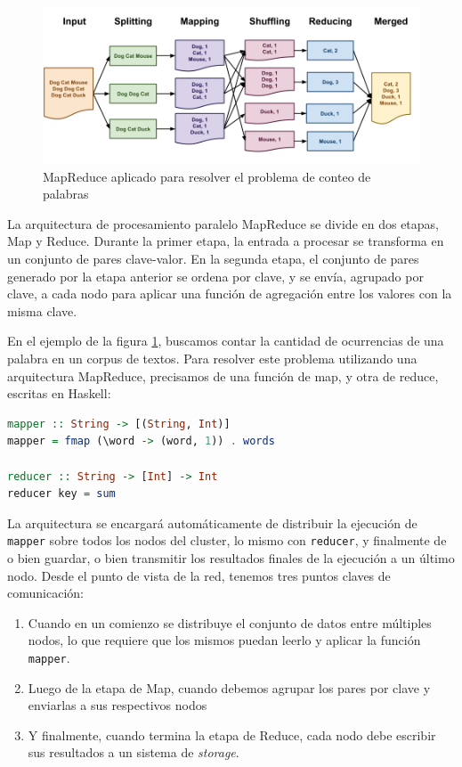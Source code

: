 \documentclass[runningheads,a4paper]{llncs}
\begin{document}
\begin{figure}[b!]
    \centering
    \includegraphics[width=1\textwidth]{figures/MapReduce_Example.png}
    \caption{MapReduce aplicado para resolver el problema de conteo de palabras}
    \label{fig:mapreduce_example}
\end{figure}

La arquitectura de procesamiento paralelo MapReduce se divide en dos etapas, Map y Reduce. Durante la primer etapa, la entrada a procesar se transforma en un conjunto de pares clave-valor. En la segunda etapa, el conjunto de pares generado por la etapa anterior se ordena por clave, y se envía, agrupado por clave, a cada nodo para aplicar una función de agregación entre los valores con la misma clave.

En el ejemplo de la figura \ref{fig:mapreduce_example}, buscamos contar la cantidad de ocurrencias de una palabra en un corpus de textos. Para resolver este problema utilizando una arquitectura MapReduce, precisamos de una función de map, y otra de reduce, escritas en Haskell:

\begin{lstlisting}[language=Haskell]
mapper :: String -> [(String, Int)]
mapper = fmap (\word -> (word, 1)) . words

reducer :: String -> [Int] -> Int
reducer key = sum
\end{lstlisting}

La arquitectura se encargará automáticamente de distribuir la ejecución de \verb|mapper| sobre todos los nodos del cluster, lo mismo con \verb|reducer|, y finalmente de o bien guardar, o bien transmitir los resultados finales de la ejecución a un último nodo. Desde el punto de vista de la red, tenemos tres puntos claves de comunicación:

\begin{enumerate}
    \item Cuando en un comienzo se distribuye el conjunto de datos entre múltiples nodos, lo que requiere que los mismos puedan leerlo y aplicar la función \verb|mapper|.
    
    \item Luego de la etapa de Map, cuando debemos agrupar los pares por clave y enviarlas a sus respectivos nodos
    
    \item Y finalmente, cuando termina la etapa de Reduce, cada nodo debe escribir sus resultados a un sistema de \textit{storage}.
\end{enumerate}
\end{document}
